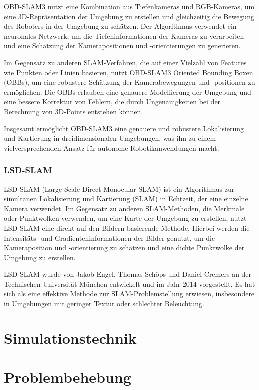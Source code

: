 OBD-SLAM3 nutzt eine Kombination aus Tiefenkameras und RGB-Kameras, um eine 3D-Repräsentation der Umgebung zu erstellen und gleichzeitig die Bewegung des Roboters in der Umgebung zu schätzen. Der Algorithmus verwendet ein neuronales Netzwerk, um die Tiefeninformationen der Kameras zu verarbeiten und eine Schätzung der Kamerapositionen und -orientierungen zu generieren.

Im Gegensatz zu anderen SLAM-Verfahren, die auf einer Vielzahl von Features wie Punkten oder Linien basieren, nutzt OBD-SLAM3 Oriented Bounding Boxen (OBBs), um eine robustere Schätzung der Kamerabewegungen und -positionen zu ermöglichen. Die OBBs erlauben eine genauere Modellierung der Umgebung und eine bessere Korrektur von Fehlern, die durch Ungenauigkeiten bei der Berechnung von 3D-Points entstehen können.

Insgesamt ermöglicht OBD-SLAM3 eine genauere und robustere Lokalisierung und Kartierung in dreidimensionalen Umgebungen, was ihn zu einem vielversprechenden Ansatz für autonome Robotikanwendungen macht.

\subsubsection{LSD-SLAM}

LSD-SLAM (Large-Scale Direct Monocular SLAM) ist ein Algorithmus zur simultanen Lokalisierung und Kartierung (SLAM) in Echtzeit, der eine einzelne Kamera verwendet. Im Gegensatz zu anderen SLAM-Methoden, die Merkmale oder Punktwolken verwenden, um eine Karte der Umgebung zu erstellen, nutzt LSD-SLAM eine direkt auf den Bildern basierende Methode. Hierbei werden die Intensitäts- und Gradienteninformationen der Bilder genutzt, um die Kameraposition und -orientierung zu schätzen und eine dichte Punktwolke der Umgebung zu erstellen.

LSD-SLAM wurde von Jakob Engel, Thomas Schöps und Daniel Cremers an der Technischen Universität München entwickelt und im Jahr 2014 vorgestellt. Es hat sich als eine effektive Methode zur SLAM-Problemstellung erwiesen, insbesondere in Umgebungen mit geringer Textur oder schlechter Beleuchtung.



\section{Simulationstechnik} \label{simulationstechnik:section}

\section{Problembehebung} \label{problembehebung:section}
